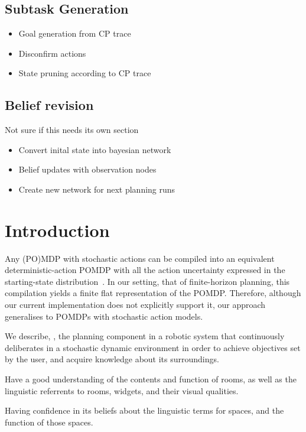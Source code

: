 \documentclass[letterpaper]{article}
\begin{document}
\subsection{Subtask Generation}
\begin{itemize}
\item Goal generation from CP trace
\item Disconfirm actions
\item State pruning according to CP trace
\end{itemize}

\subsection{Belief revision}
Not sure if this needs its own section
\begin{itemize}
\item Convert inital state into bayesian network
\item Belief updates with observation nodes
\item Create new network for next planning runs
\end{itemize}

\section{Introduction}


Any (PO)MDP with stochastic actions can be compiled into an equivalent
deterministic-action POMDP with all the action uncertainty expressed
in the starting-state distribution~\cite{ng:Jordan:2000}. In our
setting, that of finite-horizon planning, this compilation yields a
finite flat representation of the POMDP. Therefore, although our
current implementation does not explicitly support it, our approach
generalises to POMDPs with stochastic action models.




We describe, \pcogx, the planning component in a robotic system that
continuously deliberates in a stochastic dynamic environment in order
to achieve objectives set by the user, and acquire knowledge about its
surroundings.

Have a good understanding of the contents and function of rooms, as
well as the linguistic referrents to rooms, widgets, and their visual
qualities.

Having confidence in its beliefs about the linguistic terms for
spaces, and the function of those spaces.
\end{document}
